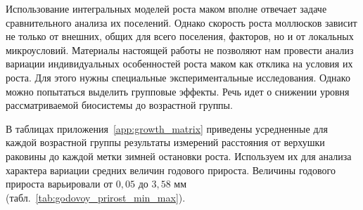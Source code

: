 Использование   интегральных   моделей   роста   маком   вполне   отвечает   задаче сравнительного анализа их поселений. 
Однако скорость роста моллюсков зависит не только от внешних,   общих   для   всего   поселения,   факторов,   но   и   от   локальных   микроусловий.      
Материалы   настоящей   работы   не   позволяют   нам   провести   анализ   вариации индивидуальных   особенностей   роста   маком   как   отклика   на   условия   их   роста.   
Для   этого нужны специальные экспериментальные исследования. 
Однако можно попытаться выделить групповые   эффекты.   
Речь   идет   о   снижении   уровня   рассматриваемой   биосистемы   до возрастной группы. 

В таблицах приложения~\ref{app:growth_matrix} приведены усредненные для каждой возрастной группы результаты измерений  расстояния  от верхушки раковины до каждой метки  зимней остановки роста.
Используем их для анализа характера вариации средних величин годового прироста. 
Величины годового прироста варьировали от $0,05$ до $3,58$ мм (табл.~\ref{tab:godovoy_prirost_min_max}).
